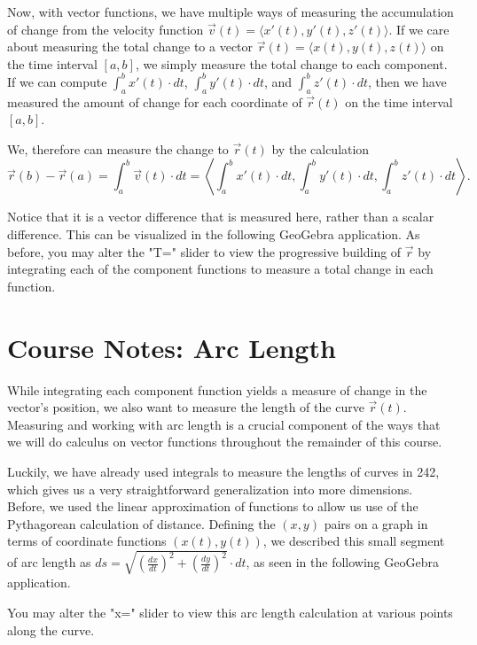 \documentclass{ximera}
\begin{document}
Now, with vector functions, we have multiple ways of measuring the accumulation of change from the velocity function $\vec{v}(t)=\langle x'(t), y'(t), z'(t)\rangle$. If we care about measuring the total change to a vector $\vec{r}(t)=\langle x(t), y(t), z(t)\rangle$ on the time interval $[a,b]$, we simply measure the total change to each component. If we can compute $\int_a^b x'(t) \cdot dt$, $\int_a^b y'(t) \cdot dt$, and $\int_a^b z'(t) \cdot dt$, then we have measured the amount of change for each coordinate of $\vec{r}(t)$ on the time interval $[a,b]$.

We, therefore can measure the change to $\vec{r}(t)$ by the calculation 
$$\vec{r}(b)-\vec{r}(a)= \int_a^b \vec{v}(t)\cdot dt=\left\langle \int_a^b x'(t)\cdot dt, \int_a^b y'(t)\cdot dt, \int_a^b z'(t)\cdot dt\right\rangle.$$

Notice that it is a vector difference that is measured here, rather than a scalar difference. This can be visualized in the following GeoGebra application. As before, you may alter the "T=" slider to view the progressive building of $\vec{r}$ by integrating each of the component functions to measure a total change in each function.

\begin{center}
\end{center}


\section{Course Notes: Arc Length}

While integrating each component function yields a measure of change in the vector's position, we also want to measure the length of the curve $\vec{r}(t)$. Measuring and working with arc length is a crucial component of the ways that we will do calculus on vector functions throughout the remainder of this course.

Luckily, we have already used integrals to measure the lengths of curves in 242, which gives us a very straightforward generalization into more dimensions. Before, we used the linear approximation of functions to allow us use of the Pythagorean calculation of distance. Defining the $(x,y)$ pairs on a graph in terms of coordinate functions $(x(t), y(t))$, we described this small segment of arc length as $ds=\sqrt{\left(\frac{dx}{dt}\right)^2+\left(\frac{dy}{dt}\right)^2}\cdot dt$, as seen in the following GeoGebra application.

You may alter the "x=" slider to view this arc length calculation at various points along the curve.
\end{document}
